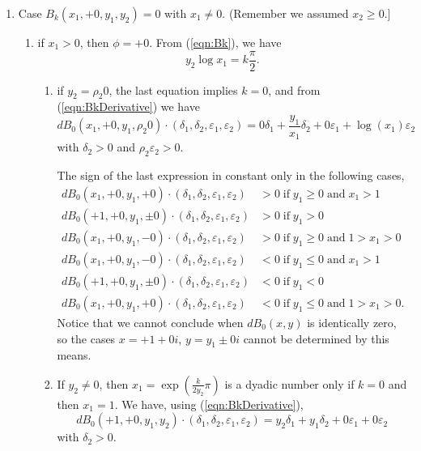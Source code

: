 \documentclass [12pt]{article}
\renewcommand {\epsilon}{\varepsilon}
\renewcommand {\leq}{\leqslant}
\renewcommand {\geq}{\geqslant}
\begin{document}
\begin {enumerate}
\begin {enumerate}
    Here, $\delta_2$ can take negative and positive values preventing the sign
    of $dB_k(\sigma_1 0, +1, k, y_2)\cdot (\delta_1, \delta_2, \epsilon_1,
    \epsilon_2)$ from being constant.
  \end {enumerate}

\item Case $B_k(x_1, +0, y_1, y_2)=0$ with $x_1 \neq 0$.
      (Remember we assumed $x_2 \geq 0$.]
  \begin {enumerate}
  \item if $x_1 >0$, then $\phi = +0$.
    From (\ref{eqn:Bk}), we have
    \[
    y_2 \log x_1 = k \frac{\pi}{2}.
    \]
    \begin {enumerate}
    \item if $y_2 = \rho_2 0$, the last equation implies $k = 0$, and from
      (\ref{eqn:BkDerivative}) we have
      \[
      dB_0(x_1, +0, y_1, \rho_2 0)\cdot(\delta_1, \delta_2, \epsilon_1,
      \epsilon_2) = 0 \delta_1 + \frac{y_1}{x_1} \delta_2 + 0 \epsilon_1 +
      \log(x_1) \epsilon_2
      \]
      with $\delta_2 > 0$ and $\rho_2 \epsilon_2 > 0$.

      The sign of the last expression in constant only in the following
      cases,
      \begin {align*}
        dB_0(x_1, +0, y_1, +0)\cdot(\delta_1, \delta_2, \epsilon_1,
        \epsilon_2) &> 0 \;\text{if}\; y_1 \geq 0 \;\text{and}\; x_1 > 1\\
        dB_0(+1, +0, y_1, \pm 0)\cdot(\delta_1, \delta_2, \epsilon_1,
        \epsilon_2) &> 0 \;\text{if}\; y_1 > 0\\
        dB_0(x_1, +0, y_1, -0)\cdot(\delta_1, \delta_2, \epsilon_1,
        \epsilon_2) &> 0 \;\text{if}\; y_1 \geq 0 \;\text{and}\; 1 > x_1 > 0 \\
        dB_0(x_1, +0, y_1, -0)\cdot(\delta_1, \delta_2, \epsilon_1,
        \epsilon_2) &< 0 \;\text{if}\; y_1 \leq 0 \;\text{and}\; x_1 > 1\\
        dB_0(+1, +0, y_1, \pm 0)\cdot(\delta_1, \delta_2, \epsilon_1,
        \epsilon_2) &< 0 \;\text{if}\; y_1 < 0\\
        dB_0(x_1, +0, y_1, +0)\cdot(\delta_1, \delta_2, \epsilon_1,
        \epsilon_2) &< 0 \;\text{if}\; y_1 \leq 0 \;\text{and}\; 1 > x_1 > 0.
      \end {align*}
      Notice that we cannot conclude when $dB_0(x,y)$ is identically zero,
      so the cases $x=+1+0i$, $y=y_1 \pm0i$ cannot be determined by this
      means.

    \item If $y_2 \neq 0$, then $x_1 = \exp\left(\frac{k}{2y_2}\pi\right)$
      is a dyadic number only if $k=0$ and then $x_1=1$.
      We have, using (\ref{eqn:BkDerivative}),
      \[
      dB_0(+1, +0, y_1, y_2)\cdot(\delta_1, \delta_2, \epsilon_1,
      \epsilon_2) = y_2 \delta_1 + y_1 \delta_2 + 0 \epsilon_1 + 0
      \epsilon_2
      \]
      with $\delta_2 > 0$.


\end{enumerate}
\end{enumerate}
\end{enumerate}
\end{document}
